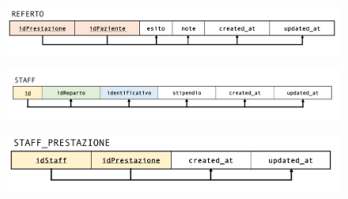 \documentclass[paper=a4, fontsize=11pt,x11names]{report}
\begin{document}
\begin{figure}[H]
\begin{center}
\includegraphics[scale=0.35]{immagini_normalizzazione/referto}
\end{center}
\end{figure}

\begin{figure}[H]
\begin{center}
\includegraphics[scale=0.28]{immagini_normalizzazione/staff}
\end{center}
\end{figure}

\begin{figure}[H]
\begin{center}
\includegraphics[scale=0.35]{immagini_normalizzazione/staff_prestazione}
\end{center}
\end{figure}
\end{document}
